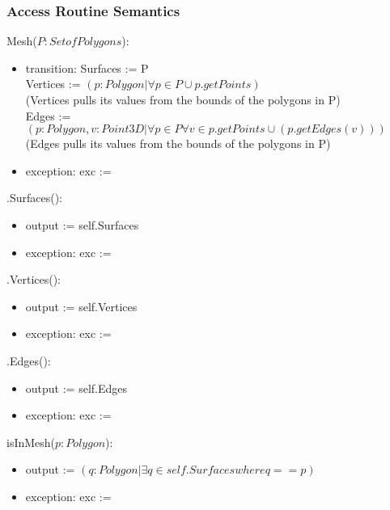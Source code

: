 \documentclass[12pt, titlepage]{article}
\begin{document}
\subsubsection{Access Routine Semantics}
\noindent Mesh($P:Set of Polygons$):
\begin{itemize}
	\item transition: Surfaces := P \\
	Vertices := $(p:Polygon | \forall p \in P \cup p.getPoints)$\\
	(Vertices pulls its values from the bounds of the polygons in P)\\
	Edges := $(p:Polygon, v:Point3D | \forall p \in P \forall v \in p.getPoints 
	\cup (p.getEdges(v)))$\\
	(Edges pulls its values from the bounds of the polygons in P)\\
	\item exception: exc := \\
\end{itemize}

\noindent .Surfaces():
\begin{itemize}
	\item output := self.Surfaces \\
	\item exception: exc := \\
\end{itemize}

\noindent .Vertices():
\begin{itemize}
	\item output := self.Vertices \\
	\item exception: exc := \\
\end{itemize}

\noindent .Edges():
\begin{itemize}
	\item output := self.Edges \\
	\item exception: exc := \\
\end{itemize}

\noindent isInMesh($p:Polygon$):
\begin{itemize}
	\item output := $(q:Polygon|\exists q \in self.Surfaces where q == p)$ \\
	\item exception: exc := \\
\end{itemize}
\end{document}
